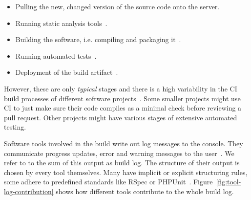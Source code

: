 \documentclass[\myrootdir/main.tex]{subfiles}
\begin{document}
\begin{itemize}
	\item Pulling the new, changed version of the source code onto the server.
	\item Running static analysis tools~\cite{zampetti2017open}.
	\item Building the software, i.e. compiling and packaging it~\cite{phillips2014understanding}.
	\item Running automated tests~\cite{beller2017oops}.
	\item Deployment of the build artifact~\cite{schermann2016empirical}.
\end{itemize}

However, these are only \emph{typical} stages and there is a high variability in the CI build processes of different software projects~\cite{staahl2014modeling}.
Some smaller projects might use CI to just make sure their code compiles as a minimal check before reviewing a pull request.
Other projects might have various stages of extensive automated testing.

Software tools involved in the build write out log messages to the console.
They communicate progress updates, error and warning messages to the user~\cite{yuan2012characterizing}.
We refer to to the sum of this output as build log.
The structure of their output is chosen by every tool themselves.
Many have implicit or explicit structuring rules, some adhere to predefined standards like RSpec or PHPUnit~\cite{phpunit2019logging,rspec2019format}.
Figure~\ref{fig:tool-log-contribution} shows how different tools contribute to the whole build log.
\end{document}
